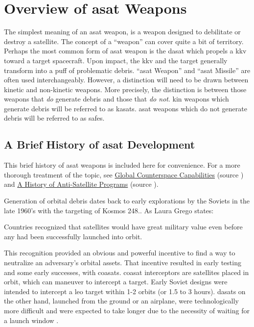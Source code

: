 \section{Overview of \acf{asat} Weapons}

The simplest meaning of an \acf{asat} weapon, is a weapon designed to
debilitate or destroy a satellite.  The concept of a ``weapon'' can
cover quite a bit of territory.  Perhaps the most common form of
\ac{asat} weapon is the \ac{dasat} which propels a \ac{kkv} toward a
target spacecraft.  Upon impact, the \ac{kkv} and the target generally
transform into a puff of problematic debris.  ``\acs{asat} Weapon''
and ``\acs{asat} Missile'' are often used interchangeably.  However, a
distinction will need to be drawn between kinetic and non-kinetic
weapons.  More precisely, the distinction is between those weapons
that \emph{do} generate debris and those that \emph{do not}.  \ac{kin}
weapons which generate debris will be referred to as \acp{kasat}.
\ac{asat} weapons which do not generate debris will be referred to as
\acp{safe}.

\subsection{A Brief History of \ac{asat} Development}

This brief history of \ac{asat} weapons is included here for
convenience.  For a more thorough treatment of the topic, see
\href{https://swfound.org/media/207344/swf_global_counterspace_capabilities_2022.pdf}{Global
  Counterspace Capabilities} (source \cite{brian}) and
\href{https://www.ucsusa.org/sites/default/files/2019-09/a-history-of-ASAT-programs_lo-res.pdf}{A
  History of Anti-Satellite Programs} (source \cite{grego}).

Generation of orbital debris dates back to early explorations by the
Soviets in the late 1960's with the targeting of Kosmos
248.\cite[p05-01]{brian}.  As Laura Grego states:
\begin{blockquote}
  Countries recognized that satellites would have great military value
  even before any had been successfully launched into
  orbit.\cite[p2]{grego}
\end{blockquote}

This recognition provided an obvious and powerful incentive to find a
way to neutralize an adversary's orbital assets. That incentive
resulted in early testing and some early successes, with \acp{coasat}.
\acs{coasat} interceptors are satellites placed in orbit, which can
maneuver to intercept a target.  Early Soviet designs were intended to
intercept a \ac{leo} target within 1-2 orbits (or 1.5 to 3 hours).
\acp{dasat} on the other hand, launched from the ground or an
airplane, were technologically more difficult\cite[4]{grego} and were
expected to take longer due to the necessity of waiting for a launch
window \cite[3]{grego}.

